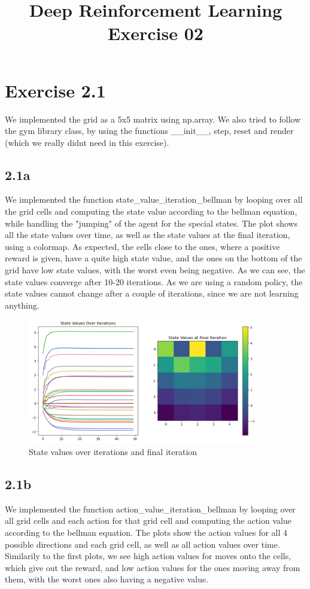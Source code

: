 \documentclass{article} %
\begin{document}
	
	\title{Deep Reinforcement Learning Exercise 02}
	\maketitle
	
	\section{Exercise 2.1}
	We implemented the grid as a 5x5 matrix using np.array. We also tried to follow the gym library class, by using the functions \_\_init\_\_, step, reset and render (which we really didnt need in this exercise). 
	\subsection{2.1a}
	We implemented the function state\_value\_iteration\_bellman by looping over all the grid cells and computing the state value according to the bellman equation, while handling the "jumping" of the agent for the special states. 
	The plot shows all the state values over time, as well as the state values at the final iteration, using a colormap. As expected, the cells close to the ones, where a positive reward is given, have a quite high state value, and the ones on the bottom of the grid have low state values, with the worst even being negative. 
	As we can see, the state values converge after 10-20 iterations. As we are using a random policy, the state values cannot change after a couple of iterations, since we are not learning anything. 
	
	\begin{figure}[h!]
		\centering
		\includegraphics[width=0.9\textwidth]{images/state_values.png}
		\caption{State values over iterations and final iteration}
		\label{fig:2}
	\end{figure}
		
	\newpage
	\subsection{2.1b}
	We implemented the function action\_value\_iteration\_bellman by looping over all grid cells and each action for that grid cell and computing the action value according to the bellman equation. 
	The plots show the action values for all 4 possible directions and each grid cell, as well as all action values over time. Similarily to the first plots, we see high action values for moves onto the cells, which give out the reward, and low action values for the ones moving away from them, with the worst ones also having a negative value.
	
\end{document}
